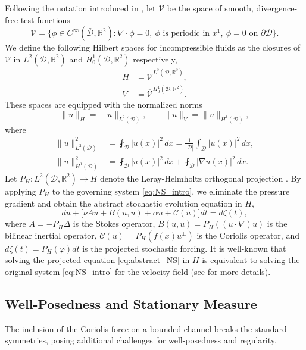 \documentclass[11pt,a4paper]{article}
\numberwithin{equation}{section}
\numberwithin{theorem}{section}
\numberwithin{remark}{section}
\numberwithin{definition}{section}
\begin{document}
Following the notation introduced in \cite{yuriamiraligigliolaWP}, let $\mathcal{V}$ be the space of smooth, divergence-free test functions
\begin{equation*}
    \mathcal{V} = \big\{ \phi \in C^\infty(\bar{\mathcal{D}}, \mathbb{R}^2) : \nabla \cdot \phi = 0, \ \phi \text{ is periodic in } x^1, \ \phi = 0 \text{ on } \partial\mathcal{D} \big\}.
\end{equation*}
We define the following Hilbert spaces for incompressible fluids as the closures of $\mathcal{V}$ in $L^2(\mathcal{D}, \mathbb{R}^2)$ and $H^1_0(\mathcal{D}, \mathbb{R}^2)$ respectively,
\begin{align}
    H &= \overline{\mathcal{V}}^{L^2(\mathcal{D}, \mathbb{R}^2)}, \\
    V &= \overline{\mathcal{V}}^{H^1_0(\mathcal{D}, \mathbb{R}^2)}.
\end{align}
These spaces are equipped with the normalized norms 
\begin{equation}\label{eq:norms}
    \|u\|_H = \|u\|_{L^2(\mathcal{D})}, \qquad \|u\|_V = \|u\|_{H^1(\mathcal{D})},
\end{equation}
where
\begin{align}
    \|u\|_{L^2(\mathcal{D})}^2&=
    \fint_\mathcal{D} |u(x)|^2\,dx=
    \frac{1}{|\mathcal{D}|}\int_\mathcal{D} |u(x)|^2\,dx,\\
     \|u\|_{H^1(\mathcal{D})}^2&=\fint_{\mathcal D} |u(x)|^2\,dx+\fint_{\mathcal D} |\nabla u(x)|^2\,dx.
\end{align}
Let $P_H : L^2(\mathcal{D}, \mathbb{R}^2) \to H$ denote the Leray-Helmholtz orthogonal projection \cite{Leray1,Leray3,Leray2}. By applying $P_H$ to the governing system \eqref{eq:NS_intro}, we eliminate the pressure gradient and obtain the abstract stochastic evolution equation in $H$,
\begin{equation}\label{eq:abstract_NS}
    du + \big[ \nu A u + B(u,u) + \alpha u + \mathcal{C}(u) \big] dt = d\zeta(t),
\end{equation}
where $A = -P_H \Delta$ is the Stokes operator, $B(u,u) = P_H((u \cdot \nabla)u)$ is the bilinear inertial operator, $\mathcal{C}(u) = P_H(f(x)u^\perp)$ is the Coriolis operator, and $d\zeta(t) = P_H(\varphi) dt$ is the projected stochastic forcing. It is well-known that solving the projected equation \eqref{eq:abstract_NS} in $H$ is equivalent to solving the original system \eqref{eq:NS_intro} for the velocity field (see \cite{yuriamiraligigliolaWP} for more details).

\subsection{Well-Posedness and Stationary Measure}
The inclusion of the Coriolis force on a bounded channel breaks the standard symmetries, posing additional challenges for well-posedness and regularity.  
\end{document}
